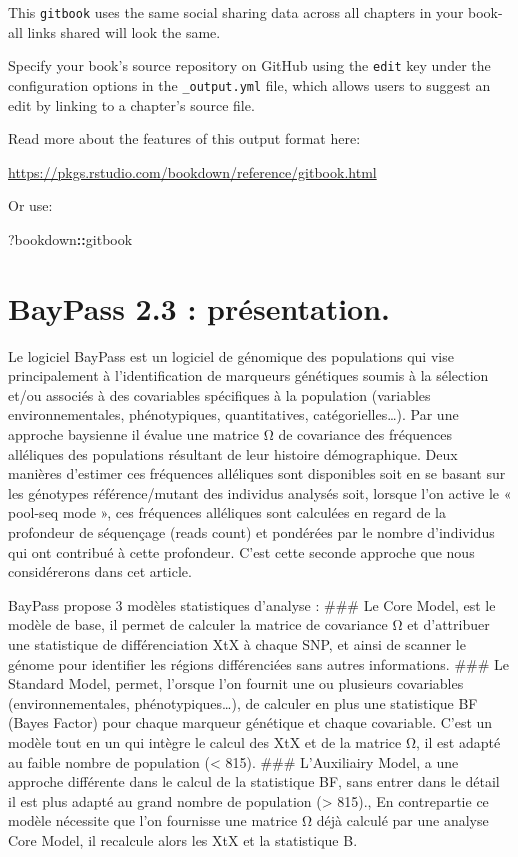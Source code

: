 \documentclass[
  openany]{book}
\newenvironment{Shaded}{\begin{snugshade}}{\end{snugshade}}
\newcommand{\NormalTok}[1]{#1}
\newcommand{\SpecialCharTok}[1]{\textcolor[rgb]{0.81,0.36,0.00}{\textbf{#1}}}
\theoremstyle{definition}
\theoremstyle{definition}
\theoremstyle{definition}
\theoremstyle{definition}
\theoremstyle{remark}
\begin{document}
This \texttt{gitbook} uses the same social sharing data across all chapters in your book- all links shared will look the same.

Specify your book's source repository on GitHub using the \texttt{edit} key under the configuration options in the \texttt{\_output.yml} file, which allows users to suggest an edit by linking to a chapter's source file.

Read more about the features of this output format here:

\url{https://pkgs.rstudio.com/bookdown/reference/gitbook.html}

Or use:

\begin{Shaded}
\begin{Highlighting}[]
\NormalTok{?bookdown}\SpecialCharTok{::}\NormalTok{gitbook}
\end{Highlighting}
\end{Shaded}

\hypertarget{baypass-2.3-pruxe9sentation.}{%
\chapter{BayPass 2.3 : présentation.}\label{baypass-2.3-pruxe9sentation.}}

Le logiciel BayPass est un logiciel de génomique des populations qui vise principalement à l'identification de marqueurs génétiques soumis à la sélection et/ou associés à des covariables spécifiques à la population (variables environnementales, phénotypiques, quantitatives, catégorielles\ldots). Par une approche baysienne il évalue une matrice Ω de covariance des fréquences alléliques des populations résultant de leur histoire démographique. Deux manières d'estimer ces fréquences alléliques sont disponibles soit en se basant sur les génotypes référence/mutant des individus analysés soit, lorsque l'on active le « pool-seq mode », ces fréquences alléliques sont calculées en regard de la profondeur de séquençage (reads count) et pondérées par le nombre d'individus qui ont contribué à cette profondeur. C'est cette seconde approche que nous considérerons dans cet article.

BayPass propose 3 modèles statistiques d'analyse :
\#\#\# Le Core Model, est le modèle de base, il permet de calculer la matrice de covariance Ω et d'attribuer une statistique de différenciation XtX à chaque SNP, et ainsi de scanner le génome pour identifier les régions différenciées sans autres informations.
\#\#\# Le Standard Model, permet, l'orsque l'on fournit une ou plusieurs covariables (environnementales, phénotypiques\ldots), de calculer en plus une statistique BF (Bayes Factor) pour chaque marqueur génétique et chaque covariable. C'est un modèle tout en un qui intègre le calcul des XtX et de la matrice Ω, il est adapté au faible nombre de population (\textless{} 815).
\#\#\# L'Auxiliairy Model, a une approche différente dans le calcul de la statistique BF, sans entrer dans le détail il est plus adapté au grand nombre de population (\textgreater{} 815)., En contrepartie ce modèle nécessite que l'on fournisse une matrice Ω déjà calculé par une analyse Core Model, il recalcule alors les XtX et la statistique B.
\end{document}
